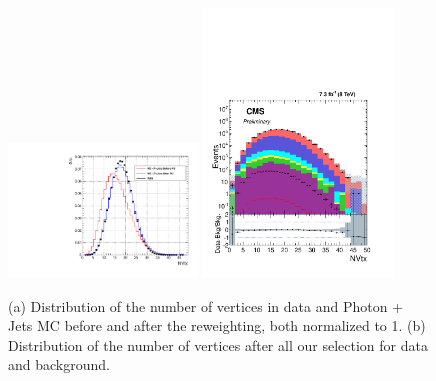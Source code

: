 \begin{figure}[htb]
\begin{center}
{\label{fig:NVtx1}\includegraphics[width=0.45\textwidth]{analysis_figs/nvtx1.pdf}}
{\label{fig:NVtx2}\includegraphics[width=0.45\textwidth]{analysis_figs/nvtx2.pdf}}
\caption{(a) Distribution of the number of vertices in data and Photon + Jets MC before and after the reweighting, both normalized to 1. (b) Distribution of the number of vertices after all our selection for data and background.}
\label{fig:vertex}
\end{center}
\end{figure}


